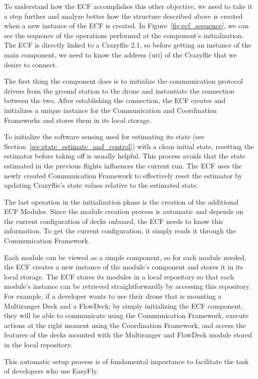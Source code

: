 To understand how the ECF accomplishes this other objective, we need to take it a step further and analyze better how the structure described above is created when a new instance of the ECF is created.
In Figure~\ref{fig:ecf_sequence}, we can see the sequence of the operations performed at the component's initialization.
The ECF is directly linked to a Crazyflie 2.1, so before getting an instance of the main component, we need to know the address (uri) of the Crazyflie that we desire to connect.

The first thing the component does is to initialize the communication protocol drivers from the ground station to the drone and instantiate the connection between the two.
After establishing the connection, the ECF creates and initializes a unique instance for the Communication and Coordination Frameworks and stores them in its local storage.

To initialize the software sensing used for estimating its state (see Section~\ref{sec:state_estimate_and_control}) with a clean initial state, resetting the estimator before taking off is usually helpful. 
This process avoids that the state estimated in the previous flights influences the current run. 
The ECF uses the newly created Communication Framework to effectively reset the estimator by updating Crazyflie's state values relative to the estimated state.

The last operation in the initialization phase is the creation of the additional ECF Modules.
Since the module creation process is automatic and depends on the current configuration of decks onboard, the ECF needs to know this information.
To get the current configuration, it simply reads it through the Communication Framework.

Each module can be viewed as a simple component, so for each module needed, the ECF creates a new instance of the module's component and stores it in its local storage. 
The ECF stores its modules in a local repository so that each module's instance can be retrieved straightforwardly by accessing this repository.
For example, if a developer wants to use their drone that is mounting a Multiranger Deck and a FlowDeck; 
by simply initializing the ECF component, they will be able to communicate using the Communication Framework, execute actions at the right moment using the Coordination Framework, and access the features of the decks mounted with the Multiranger and FlowDeck module stored in the local repository.

This automatic setup process is of fundamental importance to facilitate the task of developers who use EasyFly.

